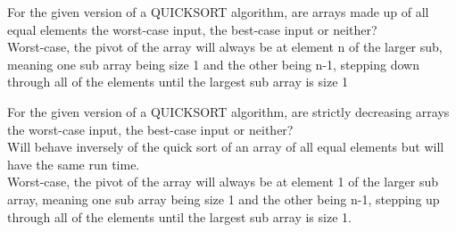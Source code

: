 \documentclass[12pt,largemargins]{homework}
\begin{document}
\question
\begin{alphaparts}
	\item For the given version of a QUICKSORT algorithm, are arrays made up of all equal elements the worst-case input, the best-case input or neither?\\
	Worst-case, the pivot of the array will always be at element n of the larger sub, meaning one sub array being size 1 and the other being n-1, stepping down through all of the elements until the largest sub array is size 1
	\item
	For the given version of a QUICKSORT algorithm, are strictly decreasing arrays the worst-case input, the best-case input or neither?\\
	Will behave inversely of the quick sort of an array of all equal elements but will have the same run time.\\
	Worst-case, the pivot of the array will always be at element 1 of the larger sub array, meaning one sub array being size 1 and the other being n-1, stepping up through all of the elements until the largest sub array is size 1.\\
\end{alphaparts}
\end{document}
